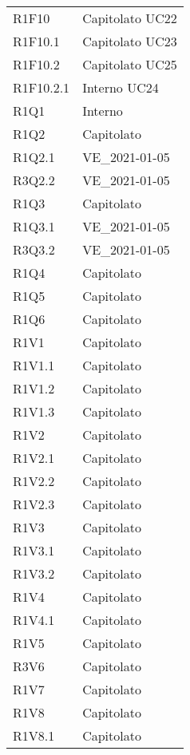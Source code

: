 {\begin{longtable}{C{3cm} C{12.5cm}}

R1F10 & Capitolato \quad UC22\\
R1F10.1 & Capitolato \quad UC23\\
R1F10.2 & Capitolato \quad UC25\\
R1F10.2.1 & Interno \quad UC24 \\


R1Q1 & Interno \\
R1Q2 & Capitolato \\
R1Q2.1 & VE\_2021-01-05 \\
R3Q2.2 & VE\_2021-01-05 \\
R1Q3 & Capitolato \\
R1Q3.1 & VE\_2021-01-05 \\
R3Q3.2 & VE\_2021-01-05 \\
R1Q4 & Capitolato \\
R1Q5 & Capitolato \\
R1Q6 & Capitolato \\


R1V1 & Capitolato \\
R1V1.1 & Capitolato \\
R1V1.2 & Capitolato \\
R1V1.3 & Capitolato \\


R1V2 & Capitolato \\
R1V2.1 & Capitolato \\
R1V2.2 & Capitolato \\
R1V2.3 & Capitolato \\


R1V3 & Capitolato \\
R1V3.1 & Capitolato \\
R1V3.2 & Capitolato \\

R1V4 & Capitolato \\
R1V4.1 & Capitolato \\

R1V5 & Capitolato \\

R3V6 & Capitolato \\

R1V7 & Capitolato \\

R1V8 & Capitolato \\
R1V8.1 & Capitolato \\


\end{longtable}}
